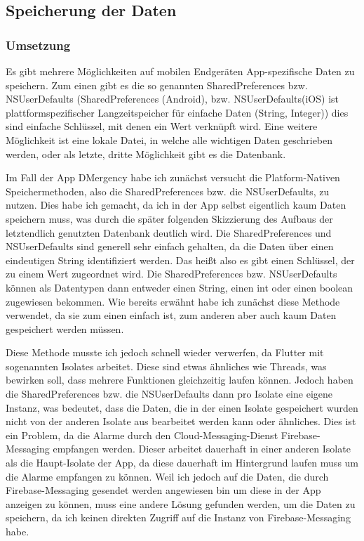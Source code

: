 \subsection{Speicherung der Daten}
\subsubsection{Umsetzung}
    Es gibt mehrere Möglichkeiten auf mobilen Endgeräten App-spezifische Daten zu speichern.
    Zum einen gibt es die so genannten SharedPreferences bzw. NSUserDefaults (SharedPreferences 
    (Android), bzw. NSUserDefaults(iOS) ist plattformspezifischer 
    Langzeitspeicher für einfache Daten (String, Integer)) dies sind einfache Schlüssel, mit 
    denen ein Wert verknüpft wird. Eine weitere Möglichkeit ist eine lokale Datei, in welche 
    alle wichtigen Daten geschrieben werden, oder als letzte, dritte Möglichkeit gibt es
    die Datenbank.

    Im Fall der App DMergency habe ich zunächst versucht die Platform-Nativen Speichermethoden, 
    also die SharedPreferences bzw. die NSUserDefaults, zu nutzen. Dies habe ich gemacht, da ich 
    in der App selbst eigentlich kaum Daten speichern muss, was durch die später folgenden 
    Skizzierung des Aufbaus der letztendlich genutzten Datenbank deutlich wird. Die 
    SharedPreferences und NSUserDefaults sind generell sehr einfach gehalten, da die Daten über 
    einen eindeutigen String identifiziert werden. Das heißt also es gibt einen \glqq Schlüssel\grqq{}, der 
    zu einem Wert zugeordnet wird. Die SharedPreferences bzw. NSUserDefaults können als 
    Datentypen dann entweder einen String, einen int oder einen boolean zugewiesen bekommen.
    Wie bereits erwähnt habe ich zunächst diese Methode verwendet, da sie zum einen einfach ist, 
    zum anderen aber auch kaum Daten gespeichert werden müssen.

    Diese Methode musste ich jedoch schnell wieder verwerfen, da Flutter mit sogenannten Isolates 
    arbeitet. Diese sind etwas ähnliches wie Threads, was bewirken soll, dass mehrere Funktionen 
    gleichzeitig laufen können. Jedoch haben die SharedPreferences bzw. die NSUserDefaults dann 
    pro Isolate eine eigene Instanz, was bedeutet, dass die Daten, die in der einen Isolate 
    gespeichert wurden nicht von der anderen Isolate aus bearbeitet werden kann oder ähnliches.
    Dies ist ein Problem, da die Alarme durch den Cloud-Messaging-Dienst Firebase-Messaging 
    empfangen werden. Dieser arbeitet dauerhaft in einer anderen Isolate als die Haupt-Isolate 
    der App, da diese dauerhaft im Hintergrund laufen muss um die Alarme empfangen zu können. 
    Weil ich jedoch auf die Daten, die durch Firebase-Messaging gesendet werden angewiesen bin um 
    diese in der App anzeigen zu können, muss eine andere Lösung gefunden werden, um die Daten 
    zu speichern, da ich keinen direkten Zugriff auf die Instanz von Firebase-Messaging habe.

